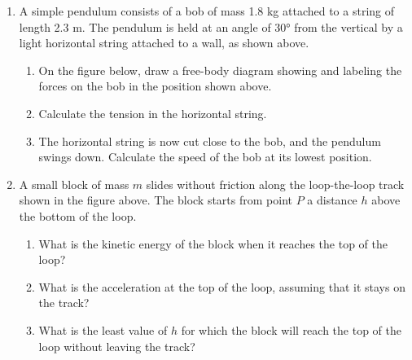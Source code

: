 \documentclass{../../../oss-classkick}
\begin{document}
\begin{enumerate}[leftmargin=15pt]
\item A simple pendulum consists of a bob of mass 1.8 kg attached to a string
  of length 2.3 m. The pendulum is held at an angle of \ang{30} from the
  vertical by a light horizontal string attached to a wall, as shown above.
  \begin{enumerate}[leftmargin=18pt,resume]
  \item On the figure below, draw a free-body diagram showing and labeling the
    forces on the bob in the position shown above.
    \begin{center}
    \end{center}
  \item Calculate the tension in the horizontal string.
  \item The horizontal string is now cut close to the bob, and the pendulum
    swings down. Calculate the speed of the bob at its lowest position.
  \end{enumerate}
  \newpage
  
  \begin{center}
  \end{center}
\item A small block of mass $m$ slides without friction along the loop-the-loop
  track shown in the figure above. The block starts from point $P$ a distance
  $h$ above the bottom of the loop.
  \begin{enumerate}[noitemsep]
  \item What is the kinetic energy of the block when it reaches the top of
    the loop?
  \item What is the acceleration at the top of the loop, assuming that it
    stays on the track?
  \item What is the least value of $h$ for which the block will reach the top
    of the loop without leaving the track?
  \end{enumerate}
  \newpage
  

\end{enumerate}
\end{document}
